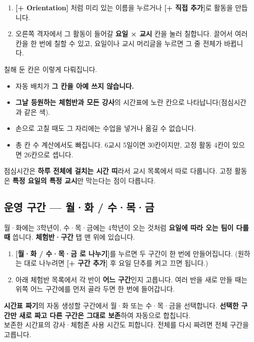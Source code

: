 \documentclass[11pt,a4paper]{article}
\newcommand{\btn}[1]{\textcolor{ttdark}{\sffamily\bfseries[#1]}}   %
\newcommand{\tab}[1]{\textcolor{ttblue}{\sffamily\bfseries#1}}      %
\newcommand{\field}[1]{\textsf{#1}}                                 %
\begin{document}
\begin{enumerate}
  \item \btn{+ Orientation} 처럼 미리 있는 이름을 누르거나 \btn{+ 직접 추가}로 활동을 만듭니다.
  \item 오른쪽 격자에서 그 활동이 들어갈 \textbf{요일 × 교시} 칸을 눌러 칠합니다.
        끌어서 여러 칸을 한 번에 칠할 수 있고, 요일이나 교시 머리글을 누르면 그 줄 전체가 바뀝니다.
\end{enumerate}

칠해 둔 칸은 이렇게 다뤄집니다.

\begin{itemize}
  \item 자동 배치가 \textbf{그 칸을 아예 쓰지 않습니다.}
  \item \textbf{그날 등원하는 체험반과 모든 강사}의 시간표에 노란 칸으로 나타납니다(점심시간과 같은 색).
  \item 손으로 고칠 때도 그 자리에는 수업을 넣거나 옮길 수 없습니다.
  \item 총 칸 수 계산에서도 빠집니다. 6교시 5일이면 30칸이지만, 고정 활동 4칸이 있으면 26칸으로 셉니다.
\end{itemize}

\begin{tip}
점심시간은 \textbf{하루 전체에 걸치는 시간 띠}라서 교시 목록에서 따로 다룹니다.
고정 활동은 \textbf{특정 요일의 특정 교시}만 막는다는 점이 다릅니다.
\end{tip}

\subsection{운영 구간 — 월·화 / 수·목·금}\label{sec:segment}

월·화에는 3학년이, 수·목·금에는 4학년이 오는 것처럼 \textbf{요일에 따라 오는 팀이 다를 때} 씁니다.
\tab{체험반·구간} 탭 맨 위에 있습니다.

\begin{enumerate}
  \item \btn{월·화 / 수·목·금 로 나누기}를 누르면 두 구간이 한 번에 만들어집니다.
        (원하는 대로 나누려면 \btn{+ 구간 추가} 후 요일 단추를 켜고 끄면 됩니다.)
  \item 아래 체험반 목록에서 각 반이 \textbf{어느 구간}인지 고릅니다.
        여러 반을 새로 만들 때는 위쪽 \field{어느 구간에}를 먼저 골라 두면 한 번에 들어갑니다.
\end{enumerate}

\begin{danger}
\tab{시간표 짜기}의 \field{자동 생성할 구간}에서 월·화 또는 수·목·금을 선택합니다.
\textbf{선택한 구간만 새로 짜고 다른 구간은 그대로 보존}하여 자동으로 합칩니다.\\
보존한 시간표의 강사·체험존 사용 시간도 피합니다. 전체를 다시 짜려면 \field{전체 구간}을 고릅니다.
\end{danger}
\end{document}
